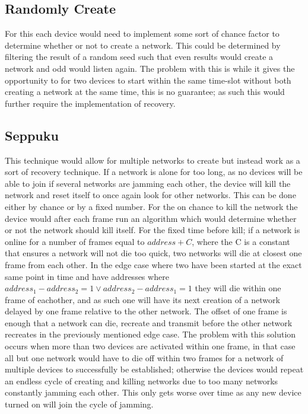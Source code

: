 \subsection{Randomly Create}\label{RCreate}
For this each device would need to implement some sort of chance factor to determine whether or not to create a network.
This could be determined by filtering the result of a random seed such that even results would create a network and odd would listen again.
The problem with this is while it gives the opportunity to for two devices to start within the same time-slot without both creating a network at the same time, this is no guarantee; as such this would further require the implementation of recovery.

\subsection{Seppuku}\label{KtN}
This technique would allow for multiple networks to create but instead work as a sort of recovery technique.
If a network is alone for too long, as no devices will be able to join if several networks are jamming each other, the device will kill the network and reset itself to once again look for other networks.
This can be done either by chance or by a fixed number.
For the on chance to kill the network the device would after each frame run an algorithm which would determine whether or not the network should kill itself.
\bigskip \noindent
For the fixed time before kill; if a network is online for a number of frames equal to $address + C$, where the C is a constant that ensures a network will not die too quick, two networks will die at closest one frame from each other.
In the edge case where two have been started at the exact same point in time and have addresses where $address_1 - address_2 = 1 \lor address_2 - address_1 = 1$ they will die within one frame of eachother, and as such one will have its next creation of a network delayed by one frame relative to the other network.
The offset of one frame is enough that a network can die, recreate and transmit before the other network recreates in the previously mentioned edge case.
The problem with this solution occurs when more than two devices are activated within one frame, in that case all but one network would have to die off within two frames for a network of multiple devices to successfully be established; otherwise the devices would repeat an endless cycle of creating and killing networks due to too many networks constantly jamming each other.
This only gets worse over time as any new device turned on will join the cycle of jamming.

